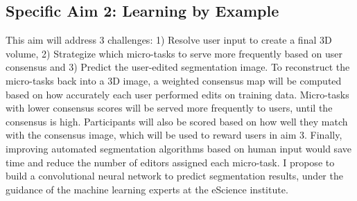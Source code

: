 
\subsection{Specific Aim 2: Learning by Example}
This aim will address 3 challenges: 1) Resolve user input to create a final 3D volume, 2) Strategize which micro-tasks to serve more frequently based on user consensus and 3) Predict the user-edited segmentation image. To reconstruct the micro-tasks back into a 3D image, a weighted consensus map will be computed based on how accurately each user performed edits on training data. Micro-tasks with lower consensus scores will be served more frequently to users, until the consensus is high. Participants will also be scored based on how well they match with the consensus image, which will be used to reward users in aim 3. Finally, improving automated segmentation algorithms based on human input would save time and reduce the number of editors assigned each micro-task. I propose to build a convolutional neural network to predict segmentation results, under the guidance of the machine learning experts at the eScience institute. 

